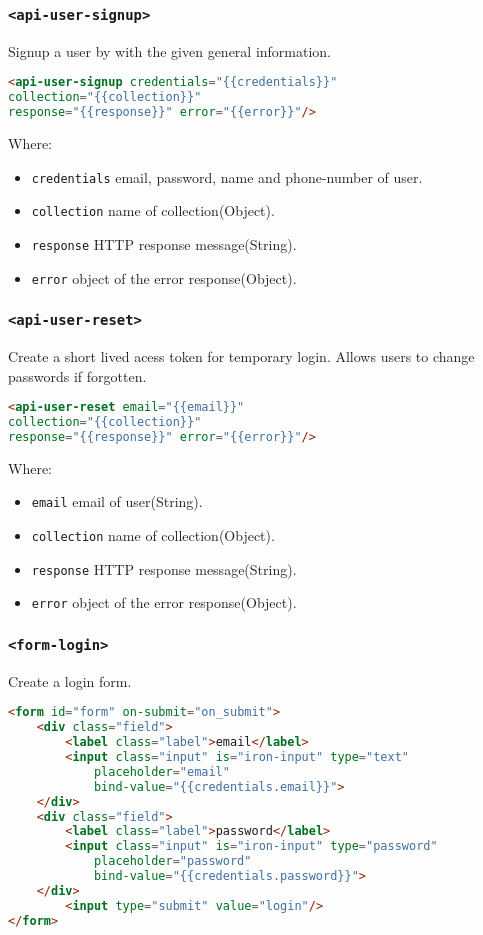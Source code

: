 \subsubsection{\texttt{<api-user-signup>}}

Signup a user by with the given general information.
\begin{lstlisting}[language=html]
<api-user-signup credentials="{{credentials}}"
collection="{{collection}}" 
response="{{response}}" error="{{error}}"/>
\end{lstlisting}
Where:
\begin{itemize}
\item \texttt{credentials} email, password, name and phone-number of user.
\item \texttt{collection} name of collection(Object).
\item \texttt{response}	HTTP response message(String).
\item \texttt{error} object of the error response(Object).
\end{itemize}

\subsubsection{\texttt{<api-user-reset>}}

Create a short lived acess token for temporary login. Allows users to change passwords if forgotten.
\begin{lstlisting}[language=html]
<api-user-reset email="{{email}}"
collection="{{collection}}" 
response="{{response}}" error="{{error}}"/>
\end{lstlisting}
Where:
\begin{itemize}
\item \texttt{email} email of user(String).
\item \texttt{collection} name of collection(Object).
\item \texttt{response}	HTTP response message(String).
\item \texttt{error} object of the error response(Object).
\end{itemize}

\subsubsection{\texttt{<form-login>}}

Create a login form.
\begin{lstlisting}[language=html]
<form id="form" on-submit="on_submit">
    <div class="field">
        <label class="label">email</label>
        <input class="input" is="iron-input" type="text" 
    		placeholder="email" 
            bind-value="{{credentials.email}}">
    </div>
    <div class="field">
        <label class="label">password</label>
        <input class="input" is="iron-input" type="password" 
        	placeholder="password" 
        	bind-value="{{credentials.password}}">
    </div>
      	<input type="submit" value="login"/>
</form>
\end{lstlisting}

